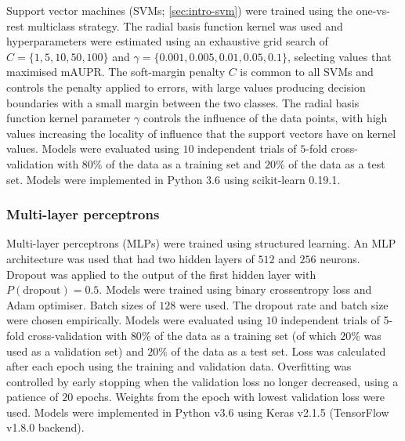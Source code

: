Support vector machines (SVMs; \ref{sec:intro-svm}) were trained using the one-vs-rest multiclass strategy.
The radial basis function kernel was used and hyperparameters were estimated using an exhaustive grid search of $C = \{1, 5, 10, 50, 100\}$ and $\gamma = \{0.001, 0.005, 0.01, 0.05, 0.1\}$, selecting values that maximised mAUPR.
The soft-margin penalty $C$ is common to all SVMs and controls the penalty applied to errors, with large values producing decision boundaries with a small margin between the two classes.
The radial basis function kernel parameter $\gamma$ controls the influence of the data points, with high values increasing the locality of influence that the support vectors have on kernel values.
Models were evaluated using $10$ independent trials of $5$-fold cross-validation with $80\%$ of the data as a training set and $20\%$ of the data as a test set.
Models were implemented in Python 3.6 \cite{Python} using scikit-learn 0.19.1.

\subsubsection{Multi-layer perceptrons}
\label{multi-layer-perceptron}

Multi-layer perceptrons (MLPs) were trained using structured learning.
An MLP architecture was used that had two hidden layers of $512$ and $256$ neurons.
Dropout was applied to the output of the first hidden layer with $P(\text{dropout}) = 0.5$.
Models were trained using binary crossentropy loss and Adam optimiser.
Batch sizes of $128$ were used.
The dropout rate and batch size were chosen empirically.
Models were evaluated using $10$ independent trials of 5-fold cross-validation with $80\%$ of the data as a training set (of which $20\%$ was used as a validation set) and $20\%$ of the data as a test set.
Loss was calculated after each epoch using the training and validation data.
Overfitting was controlled by early stopping when the validation loss no longer decreased, using a patience of $20$ epochs.
Weights from the epoch with lowest validation loss were used.
Models were implemented in Python v3.6 \cite{Python} using Keras v2.1.5 \cite{chollet2015keras}
(TensorFlow v1.8.0 \cite{GoogleResearch2015} backend).

%


